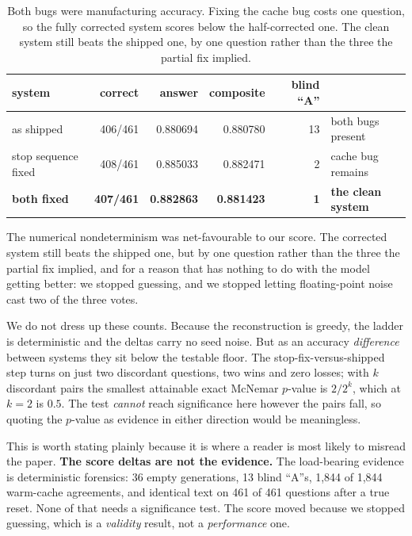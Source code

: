 \documentclass{article}
\begin{document}
\begin{table}
\centering
\begin{tabular}{lrrrrl}
\toprule
\textbf{system} & \textbf{correct} & \textbf{answer} & \textbf{composite} & \textbf{blind ``A''} & \\
\midrule
as shipped          & 406/461 & 0.880694 & 0.880780 & 13 & both bugs present \\
stop sequence fixed & 408/461 & 0.885033 & 0.882471 & 2  & cache bug remains \\
\textbf{both fixed} & \textbf{407/461} & \textbf{0.882863} & \textbf{0.881423} & \textbf{1} & \textbf{the clean system} \\
\bottomrule
\end{tabular}
\caption{Both bugs were manufacturing accuracy. Fixing the cache bug costs one question, so the fully corrected system scores below the half-corrected one. The clean system still beats the shipped one, by one question rather than the three the partial fix implied.}
\label{tab:ladder}
\end{table}

The numerical nondeterminism was net-favourable to our score. The corrected system still beats the shipped one, but by one question rather than the three the partial fix implied, and for a reason that has nothing to do with the model getting better: we stopped guessing, and we stopped letting floating-point noise cast two of the three votes.

We do not dress up these counts. Because the reconstruction is greedy, the ladder is deterministic and the deltas carry no seed noise. But as an accuracy \emph{difference} between systems they sit below the testable floor. The stop-fix-versus-shipped step turns on just two discordant questions, two wins and zero losses; with $k$ discordant pairs the smallest attainable exact McNemar $p$-value is $2/2^{k}$, which at $k=2$ is $0.5$. The test \emph{cannot} reach significance here however the pairs fall, so quoting the $p$-value as evidence in either direction would be meaningless.

This is worth stating plainly because it is where a reader is most likely to misread the paper. \textbf{The score deltas are not the evidence.} The load-bearing evidence is deterministic forensics: 36 empty generations, 13 blind ``A''s, 1,844 of 1,844 warm-cache agreements, and identical text on 461 of 461 questions after a true reset. None of that needs a significance test. The score moved because we stopped guessing, which is a \emph{validity} result, not a \emph{performance} one.
\end{document}
